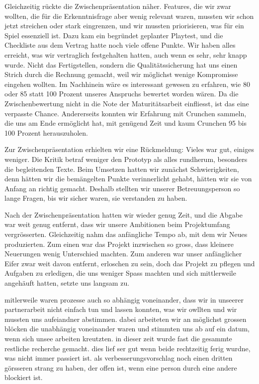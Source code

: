 \documentclass[../Main.tex]{subfiles}
\begin{document}
Gleichzeitig rückte die Zwischenpräsentation näher. Features, die wir zwar wollten, die für die Erkenntnisfrage aber wenig relevant waren, mussten wir schon jetzt streichen oder stark eingrenzen, und wir mussten priorisieren, was für ein Spiel essenziell ist. Dazu kam ein begründet geplanter Playtest, und die Checkliste aus dem Vertrag hatte noch viele offene Punkte. Wir haben alles erreicht, was wir vertraglich festgehalten hatten, auch wenn es sehr, sehr knapp wurde. Nicht das Fertigstellen, sondern die Qualitätssicherung hat uns einen Strich durch die Rechnung gemacht, weil wir möglichst wenige Kompromisse eingehen wollten. Im Nachhinein wäre es interessant gewesen zu erfahren, wie 80 oder 85 statt 100 Prozent unseres Anspruchs bewertet worden wären. Da die Zwischenbewertung nicht in die Note der Maturitätsarbeit einfliesst, ist das eine verpasste Chance. Andererseits konnten wir Erfahrung mit Crunchen sammeln, die uns am Ende ermöglicht hat, mit genügend Zeit und kaum Crunchen 95 bis 100 Prozent herauszuholen.

Zur Zwischenpräsentation erhielten wir eine Rückmeldung: Vieles war gut, einiges weniger. Die Kritik betraf weniger den Prototyp als alles rundherum, besonders die begleitenden Texte. Beim Umsetzen hatten wir zunächst Schwierigkeiten, denn hätten wir die bemängelten Punkte verinnerlicht gehabt, hätten wir sie von Anfang an richtig gemacht. Deshalb stellten wir unserer Betreuungsperson so lange Fragen, bis wir sicher waren, sie verstanden zu haben.

Nach der Zwischenpräsentation hatten wir wieder genug Zeit, und die Abgabe war weit genug entfernt, dass wir unsere Ambitionen beim Projektumfang vergrösserten. Gleichzeitig nahm das anfängliche Tempo ab, mit dem wir Neues produzierten. Zum einen war das Projekt inzwischen so gross, dass kleinere Neuerungen wenig Unterschied machten. Zum anderen war unser anfänglicher Eifer zwar weit davon entfernt, erloschen zu sein, doch das Projekt zu pflegen und Aufgaben zu erledigen, die uns weniger Spass machten und sich mittlerweile angehäuft hatten, setzte uns langsam zu.

mitlerweile waren prozesse auch so abhängig voneinander, dass wir in unseerer partnerarbeit nicht einfach tun und lassen konnten, was wir owllten und wir mussten uns aufeiandner abstimmen. dabei arbeiteten wir an möglichst grossen blöcken die unabhängig voneinander waren und stimmten uns ab auf ein datum, wenn sich unsee arbeiten kreutzten. in dieser zeit wurde fast die gesammte restliche recherche gemacht. dies lief ser gut wenn beide rechtzeitig ferig wurdne, was nicht immer passiert ist. als verbesserungsvorschlag noch einen dritten görsseren strang zu haben, der offen ist, wenn eine person durch eine andere blockiert ist.
\end{document}
